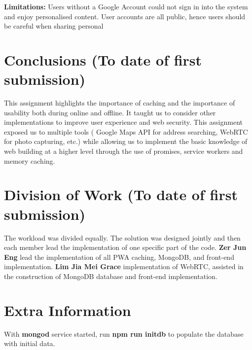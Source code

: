 \documentclass[11pt, a4paper]{article}
\begin{document}
\textbf{Limitations:} Users without a Google Account could not sign in into the system and enjoy
personalised content. User accounts are all public, hence users should be careful when sharing
personal

\section{Conclusions (To date of first submission)}
This assignment highlights the importance of caching and the importance of usability both during
online and offline. It taught us to consider other implementations to improve user experience and
web security. This assignment exposed us to multiple tools ( Google Maps API for address searching,
WebRTC for photo capturing, etc.) while allowing us to implement the basic knowledge of web building
at a higher level through the use of promises, service workers and memory caching.

\section{Division of Work (To date of first submission)}
The workload was divided equally. The solution was designed jointly and then each member lead the
implementation of one specific part of the code. \textbf{Zer Jun Eng} lead the implementation of all
PWA caching, MongoDB, and front-end implementation. \textbf{Lim Jia Mei Grace} implementation of
WebRTC, assisted in the construction of MongoDB database and front-end implementation.

\section{Extra Information}
With \textbf{mongod} service started, run \textbf{npm run initdb} to populate the database with
initial data.

\printbibliography
\end{document}
